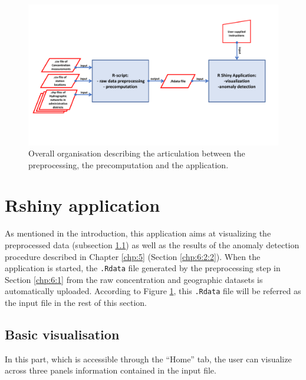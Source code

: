 \begin{figure}[htbp]
  \centering
  \includegraphics[angle = 90,scale = 0.65]{figs/Chap6/organigramme.pdf}
  \caption{Overall organisation describing the articulation between the preprocessing, the precomputation and the application.}
  \label{fig:orga}
\end{figure}

\section{Rshiny application}\label{chp:6:2}

As mentioned in the introduction, this application aims at visualizing the preprocessed data (subsection \ref{chp:6:2:1}) as well as the results of the anomaly detection procedure described in Chapter \ref{chp:5} (Section \ref{chp:6:2:2}). When the application is started, the \texttt{.Rdata} file generated by the preprocessing step in Section \ref{chp:6:1} from the raw concentration and geographic datasets is automatically uploaded. According to Figure \ref{fig:orga}, this \texttt{.Rdata} file will be referred as the input file in the rest of this section. 

\subsection{Basic visualisation}\label{chp:6:2:1}

  

In this part, which is accessible through the ``Home'' tab, the user can visualize across three panels information contained in the input file.

